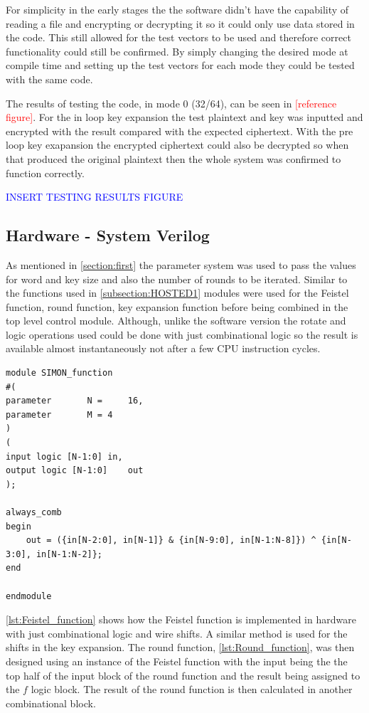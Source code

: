 \documentclass[12pt,twoside,a4paper]{report}
\begin{document}
	For simplicity in the early stages the the software didn't have the capability of reading a file and encrypting or decrypting it so it could only use data stored in the code. This still allowed for the test vectors to be used and therefore correct functionality could still be confirmed.  By simply changing the desired mode at compile time and setting up the test vectors for each mode they could be tested with the same code.
	
	The results of testing the code, in mode 0 (32/64), can be seen in \textcolor{red}{[reference figure]}. For the in loop key expansion the test plaintext and key was inputted and encrypted with the result compared with the expected ciphertext. With the pre loop key exapansion the encrypted ciphertext could also be decrypted so when that produced the original plaintext then the whole system was confirmed to function correctly.
	
	\textcolor{blue}{INSERT TESTING RESULTS FIGURE}
    
	\subsection{Hardware - System Verilog}
	\label{subsection:SV1}
	As mentioned in \autoref{section:first} the parameter system was used to pass the values for word and key size and also the number of rounds to be iterated. Similar to the functions used in \autoref{subsection:HOSTED1} modules were used for the Feistel function, round function, key expansion function before being combined in the top level control module. Although, unlike the software version the rotate and logic operations used could be done with just combinational logic so the result is available almost instantaneously not after a few CPU instruction cycles. 

	\begin{minipage}{\linewidth}
	\begin{lstlisting}[label={lst:Feistel_function},caption={The feistel function},style=CStyle]	
module SIMON_function
#(
parameter 		N = 	16,
parameter 		M =	4
)
(
input logic [N-1:0]	in,
output logic [N-1:0]	out
);

always_comb
begin
	out = ({in[N-2:0], in[N-1]} & {in[N-9:0], in[N-1:N-8]}) ^ {in[N-3:0], in[N-1:N-2]};
end

endmodule
	\end{lstlisting}
	\end{minipage}
	
	\autoref{lst:Feistel_function} shows how the Feistel function is implemented in hardware with just combinational logic and wire shifts.  A similar method is used for the shifts in the key expansion. The round function, \autoref{lst:Round_function}, was then designed using an instance of the Feistel function with the input being the the top half of the input block of the round function and the result being assigned to the $f$ logic block. The result of the round function is then calculated in another combinational block.
\end{document}
